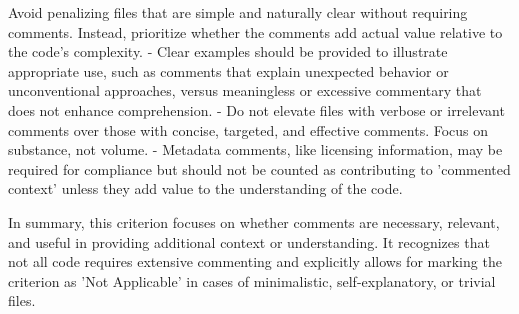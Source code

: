 \begin{tcolorbox}
    Avoid penalizing files that are simple and naturally clear without requiring
    comments. Instead, prioritize whether the comments add actual value relative
    to the code’s complexity. - Clear examples should be provided to illustrate
    appropriate use, such as comments that explain unexpected behavior or unconventional
    approaches, versus meaningless or excessive commentary that does not enhance
    comprehension. - Do not elevate files with verbose or irrelevant comments over
    those with concise, targeted, and effective comments. Focus on substance, not
    volume. - Metadata comments, like licensing information, may be required for
    compliance but should not be counted as contributing to 'commented context'
    unless they add value to the understanding of the code.\par In summary, this
    criterion focuses on whether comments are necessary, relevant, and useful in
    providing additional context or understanding. It recognizes that not all
    code requires extensive commenting and explicitly allows for marking the
    criterion as 'Not Applicable' in cases of minimalistic, self-explanatory, or
    trivial files.
\end{tcolorbox}